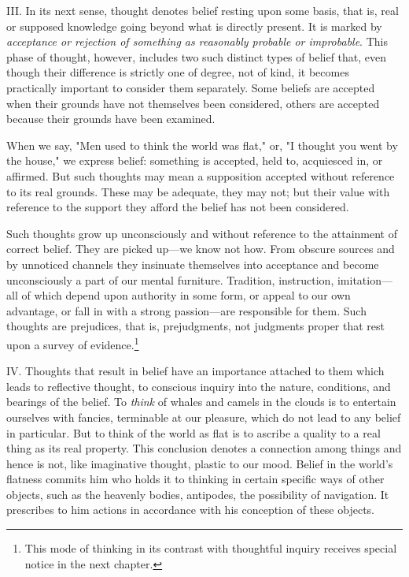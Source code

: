 \documentclass[letterpaper]{book}
\begin{document}

III. In its next sense, thought denotes belief resting upon some basis,
that is, real or supposed knowledge going beyond what is directly
present. It is marked by \emph{acceptance or rejection of something as
reasonably probable or improbable}. This phase of thought, however,
includes two such distinct types of belief that, even though their
difference is strictly one of degree, not of kind, it becomes
practically important to consider them separately. Some beliefs are
accepted when their grounds have not themselves been considered, others
are accepted because their grounds have been examined.

When we say, "Men used to think the world was flat," or, "I thought you
went by the house," we express belief: something is accepted, held to,
acquiesced in, or affirmed. But such thoughts may mean a supposition
accepted without reference to its real grounds. These may be adequate,
they may not; but their value with reference to the support they afford
the belief has not been considered.

Such thoughts grow up unconsciously and without reference to the
attainment of correct belief. They are picked up---we know not how. From
obscure sources and by unnoticed channels they insinuate themselves into
acceptance and become unconsciously a part of our mental furniture.
Tradition, instruction, imitation---all of which depend upon authority
in some form, or appeal to our own advantage, or fall in with a strong
passion---are responsible for them. Such thoughts are prejudices, that
is, prejudgments, not judgments proper that rest upon a survey of
evidence.\footnote{This mode of thinking in its contrast with thoughtful inquiry receives
special notice in the next chapter.}


IV. Thoughts that result in belief have an importance attached to them
which leads to reflective thought, to conscious inquiry into the nature,
conditions, and bearings of the belief. To \emph{think} of whales and
camels in the clouds is to entertain ourselves with fancies, terminable
at our pleasure, which do not lead to any belief in particular. But to
think of the world as flat is to ascribe a quality to a real thing as
its real property. This conclusion denotes a connection among things and
hence is not, like imaginative thought, plastic to our mood. Belief in
the world's flatness commits him who holds it to thinking in certain
specific ways of other objects, such as the heavenly bodies, antipodes,
the possibility of navigation. It prescribes to him actions in
accordance with his conception of these objects.
\end{document}
